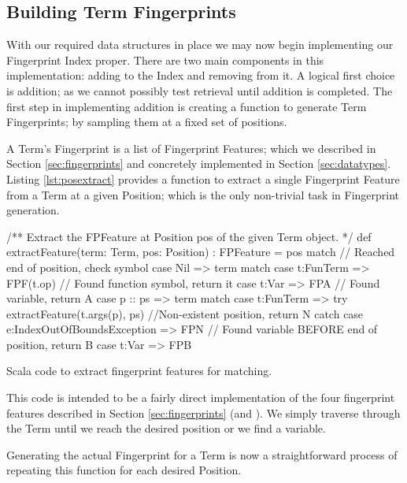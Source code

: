 \subsection{Building Term Fingerprints}
\label{sec:fpbuild}
With our required data structures in place we may now begin implementing our
Fingerprint Index proper. There are two main components in this implementation:
adding to the Index and removing from it. A logical first choice is addition; as we
cannot possibly test retrieval until addition is completed. The
first step in implementing addition is creating a function to generate Term Fingerprints; by sampling them
at a fixed set of positions.

A Term's Fingerprint is a list of Fingerprint Features; which we described in Section \ref{sec:fingerprints}
and concretely implemented in Section \ref{sec:datatypes}.
Listing \ref{lst:posextract} provides a function to extract a single Fingerprint Feature from
a Term at a given Position; which is the only non-trivial task in Fingerprint generation.
\begin{listing}[H]
\begin{scalacode}
/** Extract the FPFeature at Position pos of the given Term object. */
def extractFeature(term: Term, pos: Position) : FPFeature = pos match {
  // Reached end of position, check symbol
  case Nil     => term match {
    case t:FunTerm => FPF(t.op) // Found function symbol, return it
    case t:Var     => FPA       // Found variable, return A
  }
  case p :: ps => term match {
    case t:FunTerm => try   {extractFeature(t.args(p), ps)}
                      //Non-existent position, return N
                      catch {case e:IndexOutOfBoundsException => FPN}
    // Found variable BEFORE end of position, return B
    case t:Var     => FPB 
  }
}
\end{scalacode}
\caption{Scala code to extract fingerprint features for matching.}
\label{lst:posextract}
\end{listing}
This code is intended to be a fairly direct implementation of the four
fingerprint features described in Section \ref{sec:fingerprints}
(and \cite{shulz12}). We simply traverse through the Term until
we reach the desired position or we find a variable.

Generating the actual Fingerprint for a Term is now a straightforward process
of repeating this function for each desired Position.

